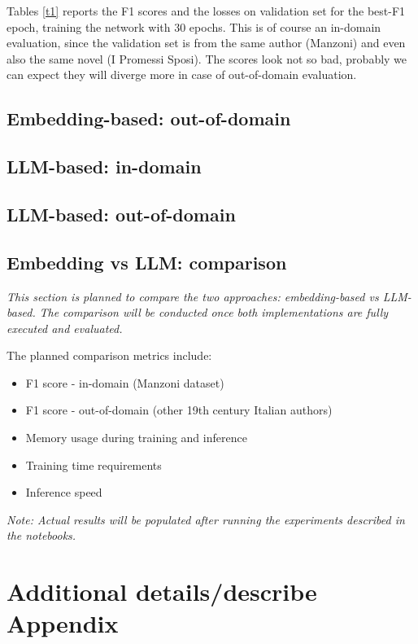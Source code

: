 \documentclass[11pt]{article}
\begin{document}
Tables \ref{t1} reports the F1 scores and the losses on validation set 
for the best-F1 epoch, training the network with 30 epochs.
This is of course an in-domain evaluation, since the validation set
is from the same author (Manzoni) and even also the same novel
(I Promessi Sposi).
The scores look not so bad, probably we can expect they will diverge
more in case of out-of-domain evaluation.

\subsection{Embedding-based: out-of-domain}

\subsection{LLM-based: in-domain}

\subsection{LLM-based: out-of-domain}

\subsection{Embedding vs LLM: comparison}

\emph{This section is planned to compare the two approaches: embedding-based vs LLM-based.}
\emph{The comparison will be conducted once both implementations are fully executed and evaluated.}

The planned comparison metrics include:

 \begin{itemize}
	\item F1 score - in-domain (Manzoni dataset)
	\item F1 score - out-of-domain (other 19th century Italian authors)
	\item Memory usage during training and inference
	\item Training time requirements
	\item Inference speed
 \end{itemize}

\emph{Note: Actual results will be populated after running the experiments described in the notebooks.}

\appendix
\section{Additional details/describe Appendix}
\label{sec:appendix1}


\end{document}
